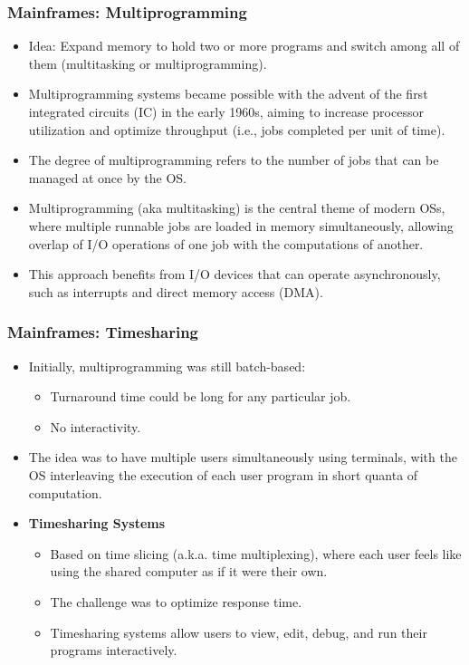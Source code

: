 \documentclass[11pt]{article}
\theoremstyle{definition}
\begin{document}
    \subsubsection{Mainframes: Multiprogramming}
    \begin{itemize}
        \item Idea: Expand memory to hold two or more programs and switch among all of them (multitasking or multiprogramming).
        \item Multiprogramming systems became possible with the advent of the first integrated circuits (IC) in the early 1960s, aiming to increase processor utilization and optimize throughput (i.e., jobs completed per unit of time).
        \item The degree of multiprogramming refers to the number of jobs that can be managed at once by the OS.
        \item Multiprogramming (aka multitasking) is the central theme of modern OSs, where multiple runnable jobs are loaded in memory simultaneously, allowing overlap of I/O operations of one job with the computations of another.
        \item This approach benefits from I/O devices that can operate asynchronously, such as interrupts and direct memory access (DMA).
    \end{itemize}
    \newpage
    \subsubsection{Mainframes: Timesharing}
    \begin{itemize}
        \item Initially, multiprogramming was still batch-based:
        \begin{itemize}
            \item Turnaround time could be long for any particular job.
            \item No interactivity.
        \end{itemize}
        \item The idea was to have multiple users simultaneously using terminals, with the OS interleaving the execution of each user program in short quanta of computation.
        \item \textbf{Timesharing Systems}
        \begin{itemize}
            \item Based on time slicing (a.k.a. time multiplexing), where each user feels like using the shared computer as if it were their own.
            \item The challenge was to optimize response time.
            \item Timesharing systems allow users to view, edit, debug, and run their programs interactively.
    \end{itemize}
    \end{itemize}
\end{document}

